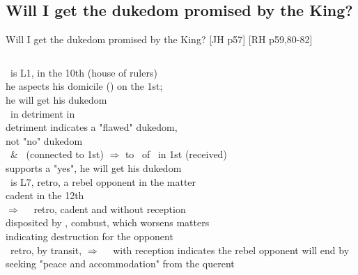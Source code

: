 \subsection{Will I get the dukedom promised by the King?}
\begin{frame}[t]{Will I get the dukedom promised by the King? [JH p57] [RH p59,80-82]}
\begin{columns}[T, onlytextwidth]
\footnotesize
\Jupiter\ is L1, in the 10th (house of rulers)\\
\hspace{1em}he aspects his domicile  (\Sagittarius) on the 1st; \\
\hspace{1em}he will get his dukedom \\
\Jupiter\ in detriment in \Virgo\\ 
\hspace{1em}detriment indicates a "flawed" dukedom, \\
\hspace{1em}not "no" dukedom \\
\Sun\ \& \Venus\ (connected to 1st) $\Rightarrow$ to \Square\ of \Sagittarius\ in 1st (received) \\
\hspace{1em}supports a "yes", he will get his dukedom\\
\vspace{0.5em}
\Mercury\ is L7, retro, a rebel opponent in the matter \\
\hspace{1em}cadent in the 12th \\
\hspace{1em}$\Rightarrow$ \Opposition\ \Saturn\ retro, cadent and without reception \\
\hspace{1em}disposited by \Venus, combust, which worsens matters \\
\hspace{1em}indicating destruction for the opponent \\
\vspace{0.5em}
\Mercury\ retro, by transit, $\Rightarrow$ \Sextile\ \Jupiter\ with reception indicates the rebel opponent will end by seeking "peace and accommodation" from the querent


\end{columns}
\end{frame}
